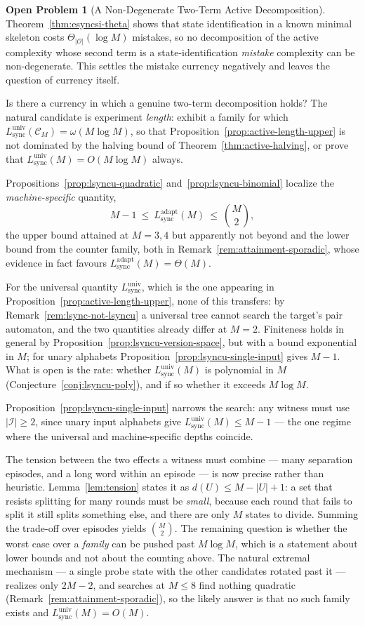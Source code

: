 \documentclass[12pt]{article}
\theoremstyle{definition}
\newtheorem{openproblem}[theorem]{Open Problem}
\newcommand{\Lsync}{L_{\mathrm{sync}}^{\mathrm{adapt}}}
\newcommand{\Lsyncu}{L_{\mathrm{sync}}^{\mathrm{univ}}}
\begin{document}
\begin{openproblem}[A Non-Degenerate Two-Term Active Decomposition]
\label{open:si-hard-family}
Theorem~\ref{thm:esyncsi-theta} shows that state identification in a known
minimal skeleton costs $\Theta_{|\mathcal O|}(\log M)$ mistakes, so no
decomposition of the active complexity whose second term is a
state-identification \emph{mistake} complexity can be non-degenerate.  This
settles the mistake currency negatively and leaves the question of currency
itself.

Is there a currency in which a genuine two-term decomposition holds?
The natural candidate is experiment \emph{length}: exhibit a family for which
$\Lsyncu(\mathcal C_M)=\omega(M\log M)$, so that
Proposition~\ref{prop:active-length-upper} is not dominated by the halving
bound of Theorem~\ref{thm:active-halving}, or prove that
$\Lsyncu(M)=O(M\log M)$ always.

Propositions~\ref{prop:lsyncu-quadratic} and~\ref{prop:lsyncu-binomial}
localize the \emph{machine-specific} quantity,
\[
M-1\ \le\ \Lsync(M)\ \le\ \binom{M}{2},
\]
the upper bound attained at $M=3,4$ but apparently not beyond and the lower
bound from the counter family, both in
Remark~\ref{rem:attainment-sporadic}, whose evidence in fact favours
$\Lsync(M)=\Theta(M)$.

For the universal quantity $\Lsyncu$, which is the one appearing in
Proposition~\ref{prop:active-length-upper}, none of this transfers: by
Remark~\ref{rem:lsync-not-lsyncu} a universal tree cannot search the target's
pair automaton, and the two quantities already differ at $M=2$.  Finiteness holds in general by
Proposition~\ref{prop:lsyncu-version-space}, but with a bound exponential in
$M$; for unary alphabets Proposition~\ref{prop:lsyncu-single-input} gives
$M-1$.  What is open is the rate: whether $\Lsyncu(M)$ is polynomial in $M$
(Conjecture~\ref{conj:lsyncu-poly}), and if so whether it exceeds
$M\log M$.

Proposition~\ref{prop:lsyncu-single-input} narrows the search: any witness
must use $|\mathcal I|\ge2$, since unary input alphabets give
$\Lsyncu(M)\le M-1$ --- the one regime where the universal and machine-specific
depths coincide.

The tension between the two effects a witness must combine --- many separation
episodes, and a long word within an episode --- is now precise rather than
heuristic.  Lemma~\ref{lem:tension} states it as
$d(U)\le M-|U|+1$: a set that resists splitting for many rounds must be
\emph{small}, because each round that fails to split it still splits something
else, and there are only $M$ states to divide.  Summing the trade-off over
episodes yields $\binom{M}{2}$.  The remaining question is whether the worst
case over a \emph{family} can be pushed past $M\log M$, which is a statement
about lower bounds and not about the counting above.  The natural extremal
mechanism --- a single probe state with the other candidates rotated past it
--- realizes only $2M-2$, and searches at $M\le8$ find nothing quadratic
(Remark~\ref{rem:attainment-sporadic}), so the likely answer is that no such
family exists and $\Lsyncu(M)=O(M)$.
\end{openproblem}
\end{document}
